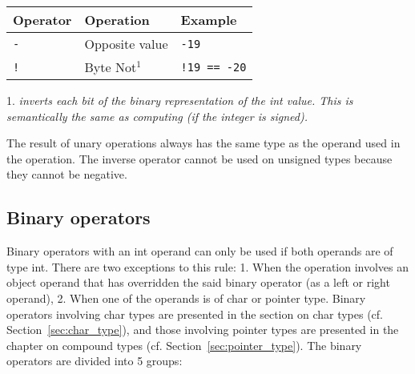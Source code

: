 \begin{center}
  \begin{threeparttable}
    \begin{tabular}{|l|ll|}
      \hline
      Operator & Operation & Example\\[0pt]
      \hline
      \hline
      \texttt{-} & Opposite value & \texttt{-19}\\[0pt]
      \hline
      \texttt{!} & Byte Not\(^{1}\) & \texttt{!19 == -20}\\[0pt]
      \hline
    \end{tabular}
    \begin{tablenotes}

    \item[1.] \footnotesize \textit{inverts each bit of the binary
      representation of the int value. This is semantically the same as
      computing  (if the integer is signed).}

    \end{tablenotes}
  \end{threeparttable}
\end{center}

The result of unary operations always has the same type as the operand used in
the operation. The inverse operator \token{-} cannot be used on unsigned types
because they cannot be negative.

\subsection{Binary operators}
\label{sec:orgb91194f}

Binary operators with an int operand can only be used if both operands are of
type int. There are two exceptions to this rule: 1. When the operation involves
an object operand that has overridden the said binary operator (as a left or
right operand), 2. When one of the operands is of char or pointer type. Binary
operators involving char types are presented in the section on char types (cf.
Section~\ref{sec:char_type}), and those involving pointer types are presented in
the chapter on compound types (cf. Section~\ref{sec:pointer_type}). The binary
operators are divided into 5 groups:

